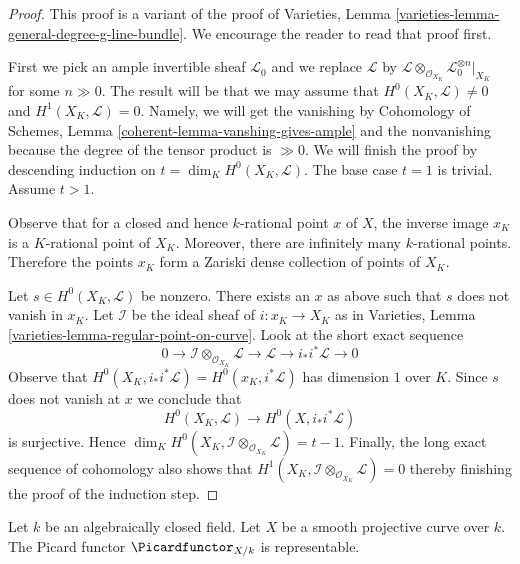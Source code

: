 \begin{proof}
This proof is a variant of the proof of
Varieties, Lemma \ref{varieties-lemma-general-degree-g-line-bundle}.
We encourage the reader to read that proof first.

\medskip\noindent
First we pick an ample invertible sheaf $\mathcal{L}_0$ and
we replace $\mathcal{L}$ by
$\mathcal{L} \otimes_{\mathcal{O}_{X_K}} \mathcal{L}_0^{\otimes n}|_{X_K}$
for some $n \gg 0$. The result will be that we may assume that
$H^0(X_K, \mathcal{L}) \not = 0$ and $H^1(X_K, \mathcal{L}) = 0$.
Namely, we will get the vanishing by Cohomology of Schemes, Lemma
\ref{coherent-lemma-vanshing-gives-ample} and the nonvanishing because
the degree of the tensor product is $\gg 0$.
We will finish the proof by descending induction on
$t = \dim_K H^0(X_K, \mathcal{L})$. The base case $t = 1$ is trivial.
Assume $t > 1$.

\medskip\noindent
Observe that for a closed and hence $k$-rational point $x$
of $X$, the inverse image $x_K$ is a $K$-rational point of $X_K$.
Moreover, there are infinitely many $k$-rational points. Therefore
the points $x_K$ form a Zariski dense collection of points of $X_K$.

\medskip\noindent
Let $s \in H^0(X_K, \mathcal{L})$ be nonzero. There exists an $x$
as above such that $s$ does not vanish in $x_K$. Let $\mathcal{I}$
be the ideal sheaf of $i : x_K \to X_K$ as in
Varieties, Lemma \ref{varieties-lemma-regular-point-on-curve}. Look at the
short exact sequence
$$
0 \to \mathcal{I} \otimes_{\mathcal{O}_{X_K}} \mathcal{L} \to
\mathcal{L} \to i_*i^*\mathcal{L} \to 0
$$
Observe that $H^0(X_K, i_*i^*\mathcal{L}) = H^0(x_K, i^*\mathcal{L})$
has dimension $1$ over $K$. Since $s$ does not vanish at $x$ we conclude that
$$
H^0(X_K, \mathcal{L}) \longrightarrow H^0(X, i_*i^*\mathcal{L})
$$
is surjective. Hence
$\dim_K H^0(X_K, \mathcal{I} \otimes_{\mathcal{O}_{X_K}} \mathcal{L}) = t - 1$.
Finally, the long exact sequence of cohomology also shows that
$H^1(X_K, \mathcal{I} \otimes_{\mathcal{O}_{X_K}} \mathcal{L}) = 0$
thereby finishing the proof of the induction step.
\end{proof}

\begin{proposition}
\label{proposition-pic-curve}
Let $k$ be an algebraically closed field. Let $X$ be a smooth projective
curve over $k$. The Picard functor $\Picardfunctor_{X/k}$ is representable.
\end{proposition}

